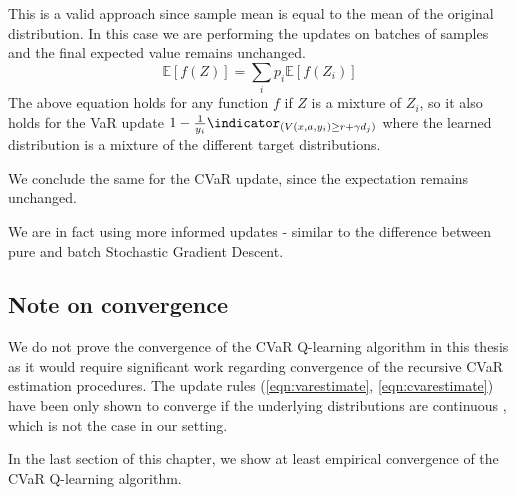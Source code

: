 This is a valid approach since sample mean is equal to the mean of the original distribution. In this case we are performing the updates on batches of samples and the final expected value remains unchanged.
\begin{equation*}
\mathbb{E}[f(Z)] = \sum_i p_i \mathbb{E}[f(Z_i)]
\end{equation*}
The above equation holds for any function $f$ if $Z$ is a mixture of $Z_i$, so it also holds for the VaR update $1 - \frac{1}{y_i}\indicator_{(V(x, a, y_i) \ge r+\gamma d_j)}$ where the learned distribution is a mixture of the different target distributions.

We conclude the same for the CVaR update, since the expectation remains unchanged. 

We are in fact using more informed updates - similar to the difference between pure and batch Stochastic Gradient Descent.
%
%
%    
%	
%

\subsection{Note on convergence}
We do not prove the convergence of the CVaR Q-learning algorithm in this thesis as it would require significant work regarding convergence of the recursive CVaR estimation procedures. The update rules (\ref{eqn:varestimate}, \ref{eqn:cvarestimate})  have been only shown to converge if the underlying distributions are continuous \citep{bardou2009recursive}, which is not the case in our setting.


In the last section of this chapter, we show at least empirical convergence of the CVaR Q-learning algorithm.

